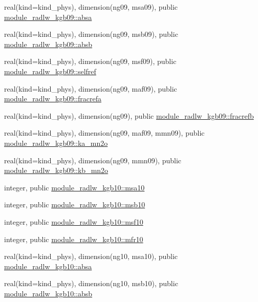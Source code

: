 \begin{DoxyCompactItemize}
\item 
real(kind=kind\+\_\+phys), dimension(ng09, msa09), public \hyperlink{namespacemodule__radlw__kgb09_a7a8726efe46fac4d6cce55ca357199ab}{module\+\_\+radlw\+\_\+kgb09\+::absa}
\item 
real(kind=kind\+\_\+phys), dimension(ng09, msb09), public \hyperlink{namespacemodule__radlw__kgb09_adb2110a245d9f01b3fd1ab058c883003}{module\+\_\+radlw\+\_\+kgb09\+::absb}
\item 
real(kind=kind\+\_\+phys), dimension(ng09, msf09), public \hyperlink{namespacemodule__radlw__kgb09_a1c65e91a215060738292d0ca5a8f38a2}{module\+\_\+radlw\+\_\+kgb09\+::selfref}
\item 
real(kind=kind\+\_\+phys), dimension(ng09, maf09), public \hyperlink{namespacemodule__radlw__kgb09_ace3d3e2731609f7ea50eb798bd212f3b}{module\+\_\+radlw\+\_\+kgb09\+::fracrefa}
\item 
real(kind=kind\+\_\+phys), dimension(ng09), public \hyperlink{namespacemodule__radlw__kgb09_a26476f00fe13c1c81d3ae0cf8e43c90b}{module\+\_\+radlw\+\_\+kgb09\+::fracrefb}
\item 
real(kind=kind\+\_\+phys), dimension(ng09, maf09, mmn09), public \hyperlink{namespacemodule__radlw__kgb09_a37d98e8066c5995060a2a8451b45705f}{module\+\_\+radlw\+\_\+kgb09\+::ka\+\_\+mn2o}
\item 
real(kind=kind\+\_\+phys), dimension(ng09, mmn09), public \hyperlink{namespacemodule__radlw__kgb09_a79326139db789012d47c4750917c2cdb}{module\+\_\+radlw\+\_\+kgb09\+::kb\+\_\+mn2o}
\item 
integer, public \hyperlink{namespacemodule__radlw__kgb10_a2305b922082d1cc367276b636f09fb6c}{module\+\_\+radlw\+\_\+kgb10\+::msa10}
\item 
integer, public \hyperlink{namespacemodule__radlw__kgb10_af33570d793ca152588c14ce30ac30798}{module\+\_\+radlw\+\_\+kgb10\+::msb10}
\item 
integer, public \hyperlink{namespacemodule__radlw__kgb10_a1b69c6fe99ed4ebc7b3d78b8f842b880}{module\+\_\+radlw\+\_\+kgb10\+::msf10}
\item 
integer, public \hyperlink{namespacemodule__radlw__kgb10_a0f3944c4b86044e0c5db3dc351226c88}{module\+\_\+radlw\+\_\+kgb10\+::mfr10}
\item 
real(kind=kind\+\_\+phys), dimension(ng10, msa10), public \hyperlink{namespacemodule__radlw__kgb10_a14f18538f77c1a3d651e36acf90baa19}{module\+\_\+radlw\+\_\+kgb10\+::absa}
\item 
real(kind=kind\+\_\+phys), dimension(ng10, msb10), public \hyperlink{namespacemodule__radlw__kgb10_af1e2252355a3002080be21ce37d45c3a}{module\+\_\+radlw\+\_\+kgb10\+::absb}

\end{DoxyCompactItemize}
